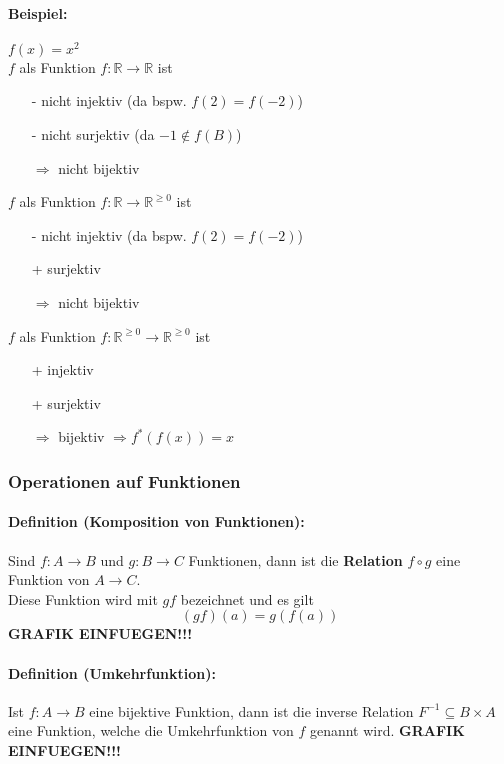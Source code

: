 \paragraph{Beispiel:}$f(x)=x^2$\\
$f$ als Funktion $f:\mathbb{R}\rightarrow\mathbb{R}$ ist
\begin{itemize}
\item[-] nicht injektiv (da bspw. $f(2)=f(-2)$)
\item[-] nicht surjektiv (da $-1\notin f(B)$)
\item[$\Rightarrow$] nicht bijektiv
\end{itemize}
$f$ als Funktion $f:\mathbb{R}\rightarrow\mathbb{R}^{\geq 0}$ ist
\begin{itemize}
\item[-] nicht injektiv (da bspw. $f(2)=f(-2)$)
\item[+] surjektiv
\item[$\Rightarrow$] nicht bijektiv
\end{itemize}
$f$ als Funktion $f:\mathbb{R}^{\geq 0}\rightarrow\mathbb{R}^{\geq 0}$ ist
\begin{itemize}
\item[+] injektiv
\item[+] surjektiv
\item[$\Rightarrow$] bijektiv $\Rightarrow f^{*}(f(x))=x$
\end{itemize}

\subsubsection{Operationen auf Funktionen}
\paragraph{Definition (Komposition von Funktionen):}Sind $f:A\rightarrow B$ und $g:B\rightarrow C$ Funktionen, dann ist die \textbf{Relation} $f\circ g$ eine Funktion von $A\rightarrow C$.\\
Diese Funktion wird mit $gf$ bezeichnet und es gilt
\[
(gf)(a)=g(f(a))
\]
\textbf{GRAFIK EINFUEGEN!!!}
\paragraph{Definition (Umkehrfunktion):}Ist $f:A\rightarrow B$ eine bijektive Funktion, dann ist die inverse Relation $F^{-1}\subseteq B\times A$ eine Funktion, welche die Umkehrfunktion von $f$ genannt wird.
\textbf{GRAFIK EINFUEGEN!!!}

